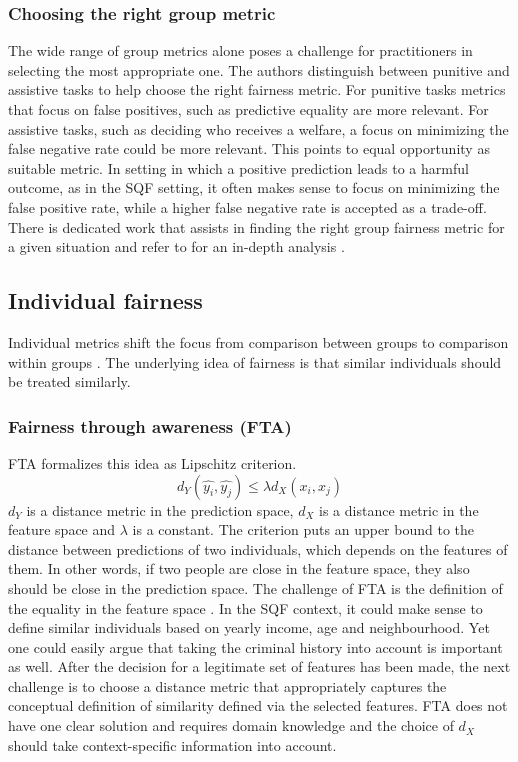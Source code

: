 \subsubsection*{Choosing the right group metric}
The wide range of group metrics alone poses a challenge for practitioners in selecting the most appropriate one.
The authors distinguish between punitive and assistive tasks to help choose the right fairness metric. For punitive tasks metrics that focus on false positives, such as predictive equality are more relevant. For assistive tasks, such as deciding who receives a welfare, a focus on minimizing the false negative rate could be more relevant. This points to equal opportunity as suitable metric.
In setting in which a positive prediction leads to a harmful outcome, as in the SQF setting, it often makes sense to focus on minimizing the false positive rate, while a higher false negative rate is accepted as a trade-off.
There is dedicated work that assists in finding the right group fairness metric for a given situation and refer to for an in-depth analysis \cite{makhlouf2021}.


\subsection{Individual fairness}
Individual metrics shift the focus from comparison between groups to comparison within groups . The underlying idea of fairness is that similar individuals should be treated similarly.

\subsubsection*{Fairness through awareness (FTA)}
FTA formalizes this idea as Lipschitz criterion. $$d_Y(\hat{y_i}, \hat{y_j}) \leq \lambda {d_X}(x_i, x_j)$$
$d_Y$ is a distance metric in the prediction space, $d_X$ is a distance metric in the feature space and $\lambda$ is a constant.
The criterion puts an upper bound to the distance between predictions of two individuals, which depends on the features of them. In other words, if two people are close in the feature space, they also should be close in the prediction space. The challenge of FTA is the definition of the equality in the feature space \cite{castelnovo2022}.
In the SQF context, it could make sense to define similar individuals based on yearly income, age and neighbourhood.
Yet one could easily argue that taking the criminal history into account is important as well. After the decision for a legitimate set of features has been made, the next challenge is to choose a distance metric that appropriately captures the conceptual definition of similarity defined via the selected features.
FTA does not have one clear solution and requires domain knowledge and the choice of $d_X$ should take context-specific information into account.

